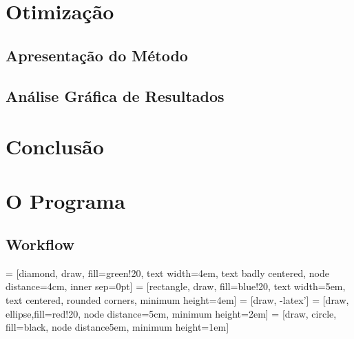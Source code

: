 \documentclass[a4paper,12pt]{report}
\begin{document}
\chapter{Otimização}

\section{Apresentação do Método}

\section{Análise Gráfica de Resultados}

\chapter{Conclusão}



\appendix
\chapter{O Programa}

\newpage

\section{Workflow}

 = [diamond, draw, fill=green!20, text width=4em, text badly centered, node distance=4cm, inner sep=0pt]
 = [rectangle, draw, fill=blue!20, text width=5em, text centered, rounded corners, minimum height=4em]
 = [draw, -latex']
 = [draw, ellipse,fill=red!20, node distance=5cm, minimum height=2em]
 = [draw, circle, fill=black, node distance5em, minimum height=1em]
    
\end{document}
